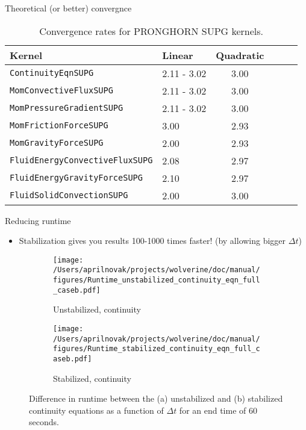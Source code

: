 \documentclass{beamer}
\begin{document}

\begin{frame}{Theoretical (or better) convergnce}

\begin{table}[H]
\caption{Convergence rates for PRONGHORN SUPG kernels.}
\centering
\begin{tabular}{l l c c c c}
\hline\hline
Kernel  & Linear & Quadratic\\ [0.5ex]
\hline
\texttt{ContinuityEqnSUPG} 				& 2.11 - 3.02 & 3.00\\
\texttt{MomConvectiveFluxSUPG} 			& 2.11 - 3.02 & 3.00\\
\texttt{MomPressureGradientSUPG} 			& 2.11 - 3.02 & 3.00\\
\texttt{MomFrictionForceSUPG} 			& 3.00 & 2.93\\
\texttt{MomGravityForceSUPG } 			& 2.00 & 2.93\\
\texttt{FluidEnergyConvectiveFluxSUPG} 		& 2.08 & 2.97\\
\texttt{FluidEnergyGravityForceSUPG} 		& 2.10 & 2.97\\
\texttt{FluidSolidConvectionSUPG} 			& 2.00	     & 3.00\\			
\hline
\end{tabular}
\label{table:TestMatrixPlanSUPG}
\end{table}

\end{frame}

\begin{frame}{Reducing runtime}
\begin{itemize}
\item Stabilization gives you results 100-1000 times faster! (by allowing bigger \(\Delta t\))
\end{itemize}

\begin{figure}[H]
\centering
\begin{subfigure}{0.45\textwidth}
  \centering
  \texttt{[image: /Users/aprilnovak/projects/wolverine/doc/manual/figures/Runtime\_unstabilized\_continuity\_eqn\_full\_caseb.pdf]}
  \caption{Unstabilized, continuity}
\end{subfigure}
\begin{subfigure}{0.45\textwidth}
  \centering
  \texttt{[image: /Users/aprilnovak/projects/wolverine/doc/manual/figures/Runtime\_stabilized\_continuity\_eqn\_full\_caseb.pdf]}
  \caption{Stabilized, continuity}
\end{subfigure}
\caption{Difference in runtime between the (a) unstabilized and (b) stabilized continuity equations as a function of \(\Delta t\) for an end time of 60 seconds.}
\end{figure}

\end{frame}
\end{document}

